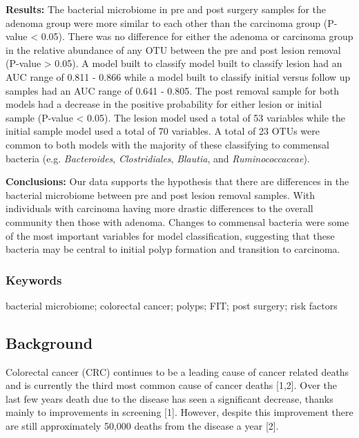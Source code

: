 \documentclass[12pt,]{article}
\begin{document}
\textbf{Results:} The bacterial microbiome in pre and post surgery
samples for the adenoma group were more similar to each other than the
carcinoma group (P-value \textless{} 0.05). There was no difference for
either the adenoma or carcinoma group in the relative abundance of any
OTU between the pre and post lesion removal (P-value \textgreater{}
0.05). A model built to classify model built to classify lesion had an
AUC range of 0.811 - 0.866 while a model built to classify initial
versus follow up samples had an AUC range of 0.641 - 0.805. The post
removal sample for both models had a decrease in the positive
probability for either lesion or initial sample (P-value \textless{}
0.05). The lesion model used a total of 53 variables while the initial
sample model used a total of 70 variables. A total of 23 OTUs were
common to both models with the majority of these classifying to
commensal bacteria (e.g. \emph{Bacteroides}, \emph{Clostridiales},
\emph{Blautia}, and \emph{Ruminococcaceae}).

\textbf{Conclusions:} Our data supports the hypothesis that there are
differences in the bacterial microbiome between pre and post lesion
removal samples. With individuals with carcinoma having more drastic
differences to the overall community then those with adenoma. Changes to
commensal bacteria were some of the most important variables for model
classification, suggesting that these bacteria may be central to initial
polyp formation and transition to carcinoma.

\newpage

\subsubsection{Keywords}\label{keywords}

bacterial microbiome; colorectal cancer; polyps; FIT; post surgery; risk
factors

\newpage

\subsection{Background}\label{background}

Colorectal cancer (CRC) continues to be a leading cause of cancer
related deaths and is currently the third most common cause of cancer
deaths {[}1,2{]}. Over the last few years death due to the disease has
seen a significant decrease, thanks mainly to improvements in screening
{[}1{]}. However, despite this improvement there are still approximately
50,000 deaths from the disease a year {[}2{]}.
\end{document}
